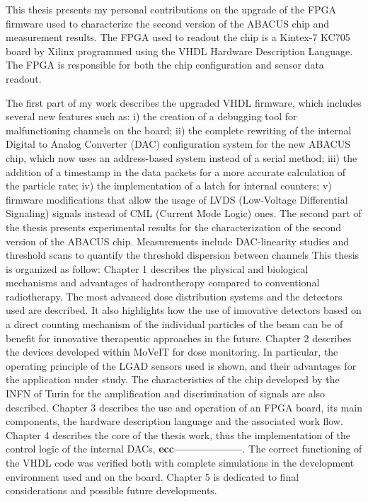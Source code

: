 This thesis presents my personal contributions on the upgrade of the FPGA firmware used to characterize
the second version of the ABACUS chip and measurement results.
The FPGA used to readout the chip is a Kintex-7 KC705 board by Xilinx programmed using the VHDL Hardware Description Language. The FPGA
is responsible for both the chip configuration and sensor data readout.

\noindent The first part of my work describes the upgraded VHDL firmware, which includes several new features such as:
i) the creation of a debugging tool for malfunctioning channels on the board;
ii) the complete rewriting of the internal Digital to Analog Converter (DAC) configuration system for the new ABACUS chip, which
now uses an address-based system instead of a serial method;
iii) the addition of a timestamp in the data packets for a more accurate calculation of the particle rate;
iv) the implementation of a latch for internal counters;
v) firmware modifications that allow the usage of LVDS (Low-Voltage Differential Signaling) signals instead of CML (Current Mode Logic) ones.
\newline
The second part of the thesis presents experimental results for the characterization of the second version of the ABACUS chip.
Measurements include DAC-linearity studies and threshold scans to quantify the threshold dispersion between channels
\vspace{1cm}
\newline
This thesis is organized as follow:
\vspace{0.25cm}
\newline
Chapter 1 describes the physical and biological mechanisms and advantages of hadrontherapy compared to conventional radiotherapy. The most advanced dose distribution systems and the detectors used are described. It also highlights how the use of innovative detectors based on a direct counting mechanism of the individual particles of the beam can be of benefit for innovative therapeutic approaches in the future.
\vspace{0.25cm}
\newline
Chapter 2 describes the devices developed within MoVeIT for dose monitoring. In particular, the operating principle of the LGAD sensors used is shown, and their advantages for the application under study. The characteristics of the chip developed by the INFN of Turin for the amplification and discrimination of signals are also described.
\vspace{0.25cm}
\newline
Chapter 3 describes the use and operation of an FPGA board, its main components, the hardware description language and the associated work flow.
\vspace{0.25cm}
\newline
Chapter 4 describes the core of the thesis work, thus the implementation of the control logic of the internal DACs, \textbf{ecc------------------}. The correct functioning of the VHDL code was verified both with complete simulations in the development environment used and on the board.
\vspace{0.25cm}
\newline
Chapter 5 is dedicated to final considerations and possible future developments.
